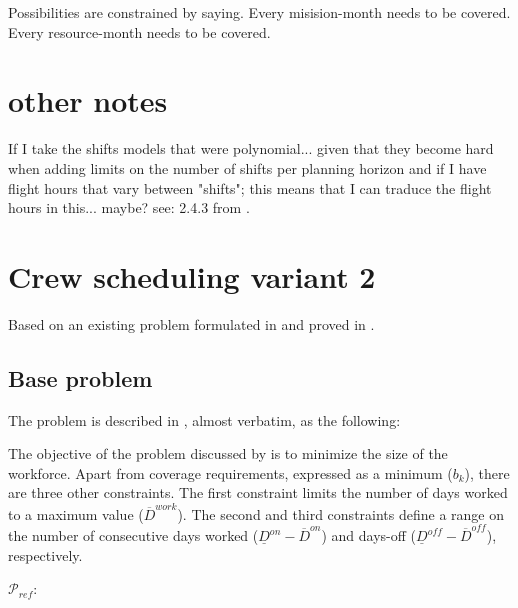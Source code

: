 \documentclass[a4paper,11pt]{article}
\begin{document}
Possibilities are constrained by saying.
Every misision-month needs to be covered.
Every resource-month needs to be covered.

\clearpage


\section{other notes}

If I take the shifts models that were polynomial... given that they become hard when adding limits on the number of shifts per planning horizon and if I have flight hours that vary between "shifts"; this means that I can traduce the flight hours in this... maybe? see: 2.4.3 from \cite{Smet2015}.


\clearpage

\section{Crew scheduling variant 2}

    Based on an existing problem formulated in \cite{Smet2015} and proved in \cite{Brunner2013}.


    \subsection{Base problem}

    The problem is described in \cite{Smet2015}, almost verbatim, as the following:

    The objective of the problem discussed by \cite{Brunner2013} is to minimize the size of the workforce. Apart from coverage requirements, expressed as a minimum ($b_{k}$), there are three other constraints. The first constraint limits the number of days worked to a maximum value ($\overline{D}^{work}$). The second and third constraints define a range on the number of consecutive days worked ($\underline{D}^{on} - \overline{D}^{on}$) and days-off ($\underline{D}^{off} - \overline{D}^{off}$), respectively.

    $\mathcal{P}_{ref}$:
\end{document}
